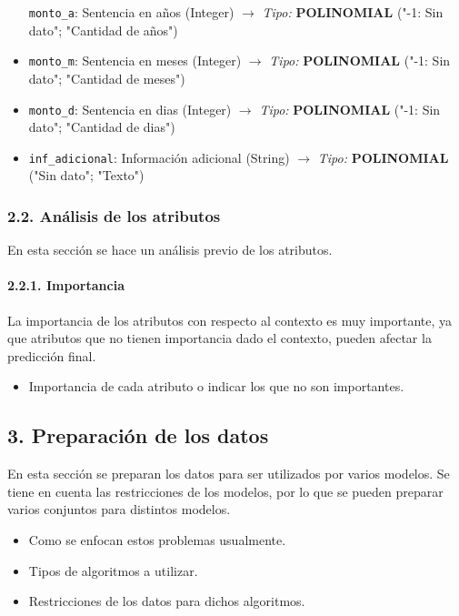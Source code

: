 \documentclass[11pt]{article}
\providecommand{\tightlist}{%
      \setlength{\itemsep}{0pt}\setlength{\parskip}{0pt}}
\begin{document}
\begin{itemize}
  \texttt{monto\_a}: Sentencia en años (Integer) \(\rightarrow\)
  \emph{Tipo:} {\textbf{POLINOMIAL} ("-1: Sin dato"; "Cantidad de
  años")}
\item
  \texttt{monto\_m}: Sentencia en meses (Integer) \(\rightarrow\)
  \emph{Tipo:} {\textbf{POLINOMIAL} ("-1: Sin dato"; "Cantidad de
  meses")}
\item
  \texttt{monto\_d}: Sentencia en dias (Integer) \(\rightarrow\)
  \emph{Tipo:} {\textbf{POLINOMIAL} ("-1: Sin dato"; "Cantidad de
  dias")}
\item
  \texttt{inf\_adicional}: Información adicional (String)
  \(\rightarrow\) \emph{Tipo:} {\textbf{POLINOMIAL} ("Sin dato";
  "Texto")}
\end{itemize}

    \subsubsection{2.2. Análisis de los atributos
}\label{anuxe1lisis-de-los-atributos}

En esta sección se hace un análisis previo de los atributos.

    \paragraph{2.2.1. Importancia }\label{importancia}

La importancia de los atributos con respecto al contexto es muy
importante, ya que atributos que no tienen importancia dado el contexto,
pueden afectar la predicción final.

\begin{itemize}
\tightlist
\item
  Importancia de cada atributo o indicar los que no son importantes.
\end{itemize}

    \subsection{3. Preparación de los datos
}\label{preparaciuxf3n-de-los-datos}

En esta sección se preparan los datos para ser utilizados por varios
modelos. Se tiene en cuenta las restricciones de los modelos, por lo que
se pueden preparar varios conjuntos para distintos modelos.

\begin{itemize}
\tightlist
\item
  Como se enfocan estos problemas usualmente.
\item
  Tipos de algoritmos a utilizar.
\item
  Restricciones de los datos para dichos algoritmos.
\end{itemize}
\end{document}
